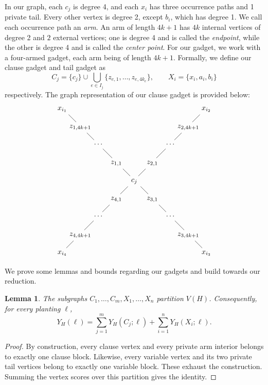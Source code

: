 \documentclass[11pt]{article}
\theoremstyle{plain}
\newtheorem{lemma}[theorem]{Lemma}
\begin{document}
In our graph, each $c_j$ is degree 4, and each $x_i$ has three occurrence paths and 1 private tail. Every other vertex is degree 2, except $b_i$, which has degree 1. We call each occurrence path an \emph{arm}. An arm of length $4k +1$ has $4k$ internal vertices of degree 2 and $2$ external vertices; one is degree 4 and is called the \emph{endpoint}, while the other is degree 4 and is called the \emph{center point}. For our gadget, we work with a four-armed gadget, each arm being of length $4k+1$. Formally, we define our clause gadget and tail gadget as
\[C_j = \{c_j\} \cup \bigcup_{e \in I_j}\{z_{e,1}, \dots, z_{e, 4k_e}\}, \qquad X_i = \{x_i, a_i, b_i\}\]
respectively. The graph representation of our clause gadget is provided below:
\[
\begin{tikzcd}[
  row sep={2.5em,between origins},
  column sep={2.5em,between origins}
]
x_{i_1} \arrow[dr, dash]
&&&&&&&& x_{i_2} \arrow[dl, dash] \\
& z_{1,4k+1} \arrow[dr, dash]
&&&&&& z_{2,4k+1} \arrow[dl, dash] \\
&& \cdots \arrow[dr, dash]
&&&& \cdots \arrow[dl, dash] \\
&&& z_{1,1} \arrow[dr, dash]
&& z_{2,1} \arrow[dl, dash] \\
&&&& c_j \arrow[dl, dash] \arrow[dr, dash] \\
&&& z_{4,1} \arrow[dl, dash]
&& z_{3,1} \arrow[dr, dash] \\
&& \cdots \arrow[dl, dash]
&&&& \cdots \arrow[dr, dash] \\
& z_{4,4k+1} \arrow[dl, dash]
&&&&&& z_{3,4k+1} \arrow[dr, dash] \\
x_{i_4} &&&&&&&& x_{i_3}
\end{tikzcd}
\]

We prove some lemmas and bounds regarding our gadgets and build towards our reduction.

\begin{lemma} \label{lem:partition}
    The subgraphs $C_1, \dots, C_m, X_1, \dots, X_n$ partition $V(H)$. Consequently, for every planting $\ell$,
    \[Y_H (\ell) = \sum_{j=1}^m Y_H(C_j;\ell) + \sum_{i=1}^n Y_H(X_i;\ell).\]
\end{lemma}

\begin{proof}
    By construction, every clause vertex and every private arm interior belongs to exactly one clause block. Likewise, every variable vertex and its two private tail vertices belong to exactly one variable block. These exhaust the construction. Summing the vertex scores over this partition gives the identity.
\end{proof}
\end{document}
